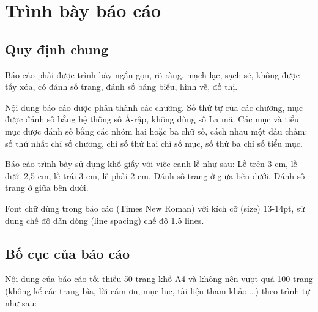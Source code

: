 \chapter{Trình bày báo cáo}
\label{Chapter2}

\section{Quy định chung}

Báo cáo phải được trình bày ngắn gọn, rõ ràng, mạch lạc, sạch sẽ, không được tẩy xóa, có đánh số trang, đánh số bảng biểu, hình vẽ, đồ thị.

Nội dung báo cáo được phân thành các chương. Số thứ tự của các chương, mục được đánh số bằng hệ thống số Ả-rập, không dùng số La mã. Các mục và tiểu mục được đánh số bằng các nhóm hai hoặc ba chữ số, cách nhau một dấu chấm: số thứ nhất chỉ số chương, chỉ số thứ hai chỉ số mục, số thứ ba chỉ số tiểu mục.



Báo cáo trình bày sử dụng khổ giấy với việc canh lề như sau: Lề trên 3 cm, lề dưới 2,5 cm, lề trái 3 cm, lề phải 2 cm. Đánh số trang ở giữa bên dưới. Đánh số trang ở giữa bên dưới.

Font chữ dùng trong báo cáo (Times New Roman) với kích cỡ (size) 13-14pt, sử dụng chế độ dãn dòng (line spacing) chế độ 1.5 lines.



\section{Bố cục của báo cáo}

Nội dung của báo cáo tối thiểu 50 trang khổ A4 và không nên vượt quá 100 trang (không kể các trang bìa, lời cám ơn, mục lục, tài liệu tham khảo \ldots) theo trình tự như sau:

